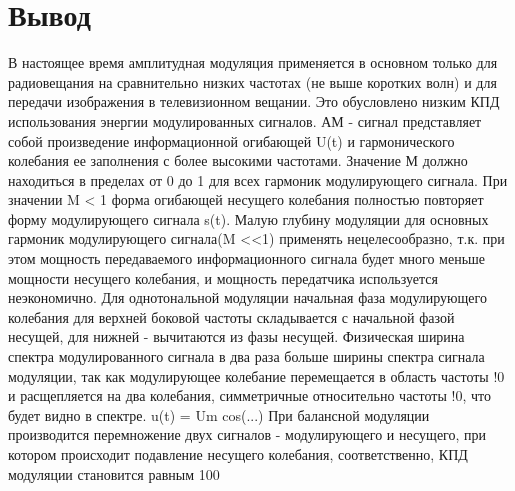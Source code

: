 \documentclass[a4paper, 12pt]{article}
\begin{document}
\section{Вывод}
В настоящее время амплитудная модуляция применяется в основном только для радиовещания на сравнительно низких частотах (не выше коротких волн) и для передачи изображения в телевизионном вещании. Это обусловлено низким КПД использования энергии модулированных сигналов. АМ - сигнал представляет собой произведение информационной огибающей U(t)
и гармонического колебания ее заполнения с более высокими частотами.
Значение М должно находиться в пределах от 0 до 1 для всех гармоник модулирующего сигнала. При значении M < 1 форма огибающей несущего колебания полностью повторяет форму модулирующего сигнала s(t). Малую
глубину модуляции для основных гармоник модулирующего сигнала(M <<1) применять нецелесообразно, т.к. при этом мощность передаваемого информационного сигнала будет много меньше мощности несущего колебания,
и мощность передатчика используется неэкономично. Для однотональной
модуляции начальная фаза модулирующего колебания для верхней боковой частоты складывается с начальной фазой несущей, для нижней - вычитаются из фазы несущей. Физическая ширина спектра модулированного
сигнала в два раза больше ширины спектра сигнала модуляции, так как
модулирующее колебание перемещается в область частоты !0 и расщепляется на два колебания, симметричные относительно частоты !0, что будет видно в спектре.
u(t) = Um cos(...)
При балансной модуляции производится перемножение двух сигналов - модулирующего и несущего, при котором происходит подавление несущего колебания, соответственно, КПД модуляции становится равным 100%

	
\end{document}
